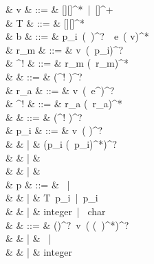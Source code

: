 \documentclass[a4paper]{article}
\begin{document}
\small
\begin{grammar}  
             & v            & ::= & [][]^*\ |\ \code{\_}[]^+ \\
        & T            & ::= & [][]^* \\
                      & b            & ::= & p_i\ (\code{:}\ \tau)^?\ \code{=}\ e\ (\code{!} v)^* \\
              & r_m              & ::= & v\ (\code{=}\ p_i)^? \\
      & ^! & ::= & r_m (\code{,}\ r_m)^* \\
             &    & ::= & (^! \code{,})^?\  \\
            & r_a              & ::= & v\ (\code{=}\ e^{})^? \\
    & ^! & ::= & r_a (\code{,}\ r_a)^* \\
           &    & ::= & (^! \code{,})^?\  \\
          & p_i          & ::= & v\ (\code{\{}  \code{\}})^? \\
                                    &              & |   & \code{(} (p_i (\code{,}\ p_i)^*)^? \code{)} \\
                                    &              & |   & \code{\#} \code{\{}  \code{\}} \\
                                    &              & |   & \code{\_} \\
                      & p            & ::= & \ |\  \\
                                    &              & |   & T\ p_i\ |\ p_i \\
                                    &              & |   & integer\ |\  char  \\
                         & \varepsilon  & ::= & ()^?\ v\ (\code{[} \tau (\code{,}\ \tau)^*\code{]})^? \\
                                    &              & |   & \ |\  \\
                                    &              & |   & integer \\

\end{grammar}
\end{document}
